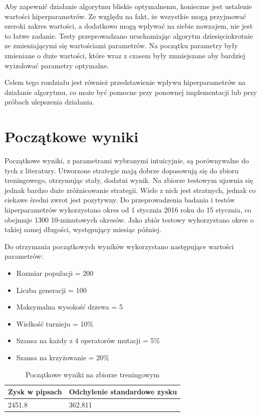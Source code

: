\documentclass[twoside]{iisthesis}
\begin{document}
Aby zapewnić działanie algorytmu bliskie optymalnemu, konieczne jest ustalenie wartości hiperparametrów. Ze względu na fakt, że wszystkie mogą przyjmować szeroki zakres wartości, a dodatkowo mogą wpływać na siebie nawzajem, nie jest to łatwe zadanie. Testy przeprowadzano uruchamiając algorytm dziesięciokrotnie ze zmieniającymi się wartościami parametrów. Na początku parametry były zmieniane o duże wartości, które wraz z czasem były zmniejszane aby bardziej wyizolować parametry optymalne.

Celem tego rozdziału jest również przedstawienie wpływu hiperparametrów na działanie algorytmu, co może być pomocne przy ponownej implementacji lub przy próbach ulepszenia działania.

\section {Początkowe wyniki}
Początkowe wyniki, z parametrami wybranymi intuicyjnie, są porównywalne do tych z literatury. Utworzone strategie mają dobrze dopasowują się do zbioru treningowego, otrzymując stały, dodatni wynik. Na zbiorze testowym ujawnia się jednak bardzo duże zróżnicowanie strategii. Wiele z nich jest stratnych, jednak co ciekawe średni zwrot jest pozytywny.
Do przeprowadzenia badania i testów hiperparametrów wykorzystano okres od 1 stycznia 2016 roku do 15 stycznia, co obejmuje 1300 10-minutowych okresów. Jako zbiór testowy wykorzystano okres o takiej samej długości, występujący miesiąc później.

Do otrzymania początkowych wyników wykorzystano następujące wartości parametrów:
\begin{itemize}
\item Rozmiar populacji = 200
\item Liczba generacji = 100
\item Maksymalna wysokość drzewa = 5
\item Wielkość turnieju = 10\%
\item Szansa na każdy z 4 operatorów mutacji = 5\%
\item Szansa na krzyżowanie = 20\%
\end{itemize}

\begin{table}
\center
\caption{Początkowe wyniki na zbiorze treningowym}
\label{wyniki1train}
\begin{tabular}{|l|l|}
  \hline
  Zysk w pipsach& Odchylenie standardowe zysku\\
  \hline
2451.8 & 362.811 \\
  \hline
\end{tabular} 
\end{table}
\end{document}

